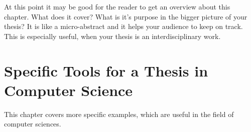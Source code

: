 \documentclass[pdftex,11pt,titlepage,twoside,openright]{report}
\begin{document}
At this point it may be good for the reader to get an overview about this chapter. What does it cover? What is it's purpose in the bigger picture of your thesis? It is like a micro-abstract and it helps your audience to keep on track. This is especially useful, when your thesis is an interdisciplinary work.



\newpage




%
%
\cleardoublepage
\chapter{Specific Tools for a Thesis in Computer Science}

This chapter covers more specific examples, which are useful in the field of computer sciences.

\newpage


%
%

\cleardoublepage
{} %
\pagestyle{plain}




\end{document}
